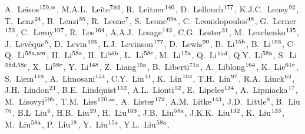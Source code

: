 \begin{flushleft}
A.~Leisos$^\textrm{\scriptsize 159,w}$,    
M.A.L.~Leite$^\textrm{\scriptsize 78d}$,    
R.~Leitner$^\textrm{\scriptsize 140}$,    
D.~Lellouch$^\textrm{\scriptsize 177}$,    
K.J.C.~Leney$^\textrm{\scriptsize 92}$,    
T.~Lenz$^\textrm{\scriptsize 24}$,    
B.~Lenzi$^\textrm{\scriptsize 35}$,    
R.~Leone$^\textrm{\scriptsize 7}$,    
S.~Leone$^\textrm{\scriptsize 69a}$,    
C.~Leonidopoulos$^\textrm{\scriptsize 48}$,    
G.~Lerner$^\textrm{\scriptsize 153}$,    
C.~Leroy$^\textrm{\scriptsize 107}$,    
R.~Les$^\textrm{\scriptsize 164}$,    
A.A.J.~Lesage$^\textrm{\scriptsize 142}$,    
C.G.~Lester$^\textrm{\scriptsize 31}$,    
M.~Levchenko$^\textrm{\scriptsize 135}$,    
J.~Lev\^eque$^\textrm{\scriptsize 5}$,    
D.~Levin$^\textrm{\scriptsize 103}$,    
L.J.~Levinson$^\textrm{\scriptsize 177}$,    
D.~Lewis$^\textrm{\scriptsize 90}$,    
B.~Li$^\textrm{\scriptsize 15b}$,    
B.~Li$^\textrm{\scriptsize 103}$,    
C-Q.~Li$^\textrm{\scriptsize 58a,am}$,    
H.~Li$^\textrm{\scriptsize 58a}$,    
H.~Li$^\textrm{\scriptsize 58b}$,    
L.~Li$^\textrm{\scriptsize 58c}$,    
M.~Li$^\textrm{\scriptsize 15a}$,    
Q.~Li$^\textrm{\scriptsize 15d}$,    
Q.Y.~Li$^\textrm{\scriptsize 58a}$,    
S.~Li$^\textrm{\scriptsize 58d,58c}$,    
X.~Li$^\textrm{\scriptsize 58c}$,    
Y.~Li$^\textrm{\scriptsize 148}$,    
Z.~Liang$^\textrm{\scriptsize 15a}$,    
B.~Liberti$^\textrm{\scriptsize 71a}$,    
A.~Liblong$^\textrm{\scriptsize 164}$,    
K.~Lie$^\textrm{\scriptsize 61c}$,    
S.~Liem$^\textrm{\scriptsize 118}$,    
A.~Limosani$^\textrm{\scriptsize 154}$,    
C.Y.~Lin$^\textrm{\scriptsize 31}$,    
K.~Lin$^\textrm{\scriptsize 104}$,    
T.H.~Lin$^\textrm{\scriptsize 97}$,    
R.A.~Linck$^\textrm{\scriptsize 63}$,    
J.H.~Lindon$^\textrm{\scriptsize 21}$,    
B.E.~Lindquist$^\textrm{\scriptsize 152}$,    
A.L.~Lionti$^\textrm{\scriptsize 52}$,    
E.~Lipeles$^\textrm{\scriptsize 134}$,    
A.~Lipniacka$^\textrm{\scriptsize 17}$,    
M.~Lisovyi$^\textrm{\scriptsize 59b}$,    
T.M.~Liss$^\textrm{\scriptsize 170,as}$,    
A.~Lister$^\textrm{\scriptsize 172}$,    
A.M.~Litke$^\textrm{\scriptsize 143}$,    
J.D.~Little$^\textrm{\scriptsize 8}$,    
B.~Liu$^\textrm{\scriptsize 76}$,    
B.L~Liu$^\textrm{\scriptsize 6}$,    
H.B.~Liu$^\textrm{\scriptsize 29}$,    
H.~Liu$^\textrm{\scriptsize 103}$,    
J.B.~Liu$^\textrm{\scriptsize 58a}$,    
J.K.K.~Liu$^\textrm{\scriptsize 132}$,    
K.~Liu$^\textrm{\scriptsize 133}$,    
M.~Liu$^\textrm{\scriptsize 58a}$,    
P.~Liu$^\textrm{\scriptsize 18}$,    
Y.~Liu$^\textrm{\scriptsize 15a}$,    
Y.L.~Liu$^\textrm{\scriptsize 58a}$,    

\end{flushleft}

